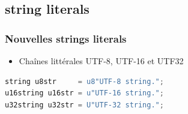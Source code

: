 \documentclass[C++.tex]{subfiles}
\begin{document}
\subsection*{string literals}
\begin{frame}[fragile]
	\frametitle{Nouvelles strings literals}
	\begin{itemize}
		\item Chaînes littérales UTF-8, UTF-16 et UTF32
	\end{itemize}

	\begin{lstlisting}[language=C++]
string u8str     = u8"UTF-8 string.";
u16string u16str = u"UTF-16 string.";
u32string u32str = U"UTF-32 string.";\end{lstlisting}
\end{frame}
\end{document}
